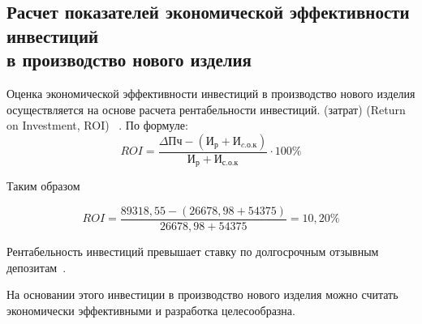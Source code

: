 \subsection{Расчет показателей экономической эффективности инвестиций \\
  в производство нового изделия}
 Оценка экономической эффективности инвестиций в производство нового
изделия осуществляется на основе расчета рентабельности инвестиций.
(затрат) (Return on Investment, ROI) ~\cite{bsuir-project-economics}.
По формуле:
\begin{equation}
  ROI= \frac{\Delta Пч - (И_р + И_{c.о.к})}{И_р + И_{с.о.к}} \cdot 100 \%
\end{equation}

Таким образом

$$ROI=\frac{89 318,55 - (26678,98 + 54375)}{26678,98 + 54375}= 10,20\%$$

Рентабельность инвестиций превышает ставку по долгосрочным отзывным
депозитам~\cite{belarusbank-vklady}.

На основании этого инвестиции в производство нового изделия можно
считать экономически эффективными и разработка целесообразна.

\newpage

